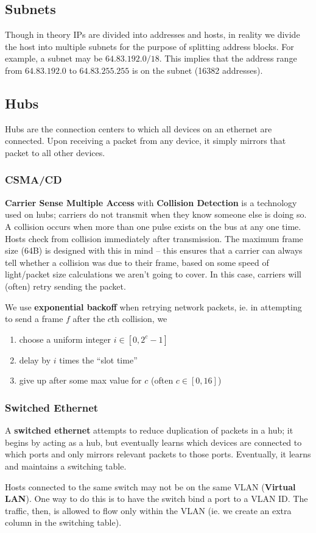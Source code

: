 \documentclass[12pt]{article}
\begin{document}
\subsection{Subnets}
Though in theory IPs are divided into addresses and hosts, in reality we divide the host into multiple subnets for the purpose of splitting address blocks. For example, a subnet may be $64.83.192.0/18$. This implies that the address range from $64.83.192.0$ to $64.83.255.255$ is on the subnet (16382 addresses).

\subsection{Hubs}
Hubs are the connection centers to which all devices on an ethernet are connected. Upon receiving a packet from any device, it simply mirrors that packet to all other devices.

\subsubsection{CSMA/CD}
{\bf Carrier Sense Multiple Access} with {\bf Collision Detection} is a technology used on hubs; carriers do not transmit when they know someone else is doing so. A collision occurs when more than one pulse exists on the bus at any one time. Hosts check from collision immediately after transmission. The maximum frame size (64B) is designed with this in mind -- this ensures that a carrier can always tell whether a collision was due to their frame, based on some speed of light/packet size calculations we aren't going to cover. In this case, carriers will (often) retry sending the packet.

We use {\bf exponential backoff} when retrying network packets, ie. in attempting to send a frame $f$ after the $c$th collision, we
\begin{enumerate}
\item choose a uniform integer $i \in [0, 2^c-1]$
\item delay by $i$ times the ``slot time''
\item give up after some max value for $c$ (often $c \in [0,16]$)
\end{enumerate}

\subsubsection{Switched Ethernet}
A {\bf switched ethernet} attempts to reduce duplication of packets in a hub; it begins by acting as a hub, but eventually learns which devices are connected to which ports and only mirrors relevant packets to those ports. Eventually, it learns and maintains a switching table.

Hosts connected to the same switch may not be on the same VLAN ({\bf Virtual LAN}). One way to do this is to have the switch bind a port to a VLAN ID. The traffic, then, is allowed to flow only within the VLAN (ie. we create an extra column in the switching table).

\end{document}
